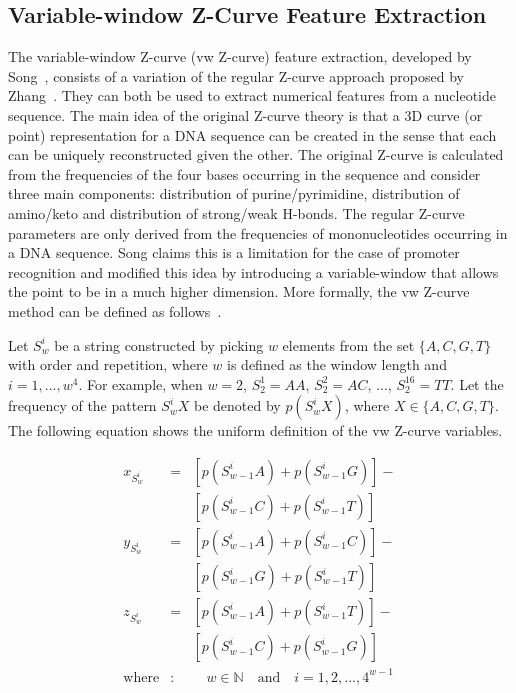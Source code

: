 \documentclass{sig-alternate}
\theoremstyle{plain}
\begin{document}
 

\subsection{Variable-window Z-Curve Feature Extraction}

The variable-window Z-curve (vw Z-curve) feature extraction, developed by Song~\cite{song2011a}, consists of a variation of the regular Z-curve approach proposed by Zhang~\cite{zhang1997}. They can both be  used to extract numerical features from a nucleotide sequence. The main idea of the original Z-curve theory is that a 3D curve (or point) representation for a DNA sequence can be created in the sense that each can be uniquely reconstructed given the other. The original Z-curve is calculated from the frequencies of the four bases occurring in the sequence and consider three main components: distribution of purine/pyrimidine, distribution of amino/keto and distribution of strong/weak H-bonds. The regular Z-curve parameters are only derived from the frequencies of mononucleotides occurring in a DNA sequence. Song claims this is a limitation for the case of  promoter recognition and  modified this idea by introducing a variable-window that allows the point to be in a much higher dimension.  More formally, the vw Z-curve method  can be defined as follows~\cite{song2011a}.

Let $ S_{w}^{i} $ be a string constructed by picking $ w $ elements from the set $ \{A,C,G,T\} $ with order and repetition, where $ w $ is defined as the window length and $ i = 1, ..., w^{4} $. For example, when $ w = 2 $, $ S_{2}^{1} = AA $, $ S_{2}^{2} = AC $, ..., $ S_{2}^{16} = TT $. Let the frequency of the pattern $ S_{w}^{i}X $ be denoted by $ p\left(S_{w}^{i}X\right) $, where $ X \in \{A,C,G,T\} $. The following equation shows the uniform definition of the vw Z-curve variables.

\begin{equation}
    \begin{array}{lcl}
        x_{S_{w}^{i}} & = & [p\left(S_{w-1}^{i}A\right) + p\left(S_{w-1}^{i}G\right)] - \\
                      &   & [p\left(S_{w-1}^{i}C\right) + p\left(S_{w-1}^{i}T\right)] \\[0.3cm]
        y_{S_{w}^{i}} & = & [p\left(S_{w-1}^{i}A\right) + p\left(S_{w-1}^{i}C\right)] - \\
                      &   & [p\left(S_{w-1}^{i}G\right) + p\left(S_{w-1}^{i}T\right)] \\[0.3cm]
        z_{S_{w}^{i}} & = & [p\left(S_{w-1}^{i}A\right) + p\left(S_{w-1}^{i}T\right)] - \\
                      &   & [p\left(S_{w-1}^{i}C\right) + p\left(S_{w-1}^{i}G\right)] \\[0.3cm]
        \text{where}  & : & \quad w \in \mathbb{N} \quad \text{and} \quad i = 1, 2, ..., 4^{w-1} \\
    \end{array} 
    \label{eq:xdef}
\end{equation}
\end{document}
